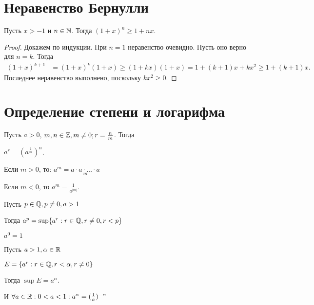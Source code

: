 


\section{Неравенство Бернулли}

\begin{theorem}
    Пусть $x > -1$ и $n \in \mathbb{N}$. Тогда $(1 + x)^n \ge 1 + nx$.

\end{theorem}

\begin{proof}
    Докажем по индукции. При $n = 1$ неравенство очевидно. Пусть оно верно для $n = k$. Тогда
    \begin{align*}
        (1 + x)^{k+1} &= (1 + x)^k (1 + x) \ge (1 + kx)(1 + x) = 1 + (k+1)x + kx^2 \ge 1 + (k+1)x.
    \end{align*}
    Последнее неравенство выполнено, поскольку $kx^2 \ge 0$.
\end{proof}

\section{Определение степени и логарифма}

\begin{definition}
    Пусть $a > 0$, $m, n \in \mathbb{Z}, m \neq 0; r = \frac{n}{m}$. Тогда 
    
    $a^r = (a^{\frac{1}{m}})^n$.

    Если $m > 0$, то: $a^m = \underset{m}{a \cdot a \cdot \ldots \cdot a}$

    Если $m < 0$, то $a^m = \frac{1}{a^{|m|}}$.
\end{definition}


\begin{definition}
    Пусть $p \in \mathbb{Q}, p \neq 0, a > 1$

    Тогда $a^p = \sup\{a^r: r \in \mathbb{Q}, r \neq 0, r < p\}$

    $a^0 = 1$
\end{definition}



\begin{definition}
    Пусть $a > 1, \alpha \in \mathbb{R}$

    $E = \{a^r: r \in \mathbb{Q}, r < \alpha, r \neq 0\}$

    Тогда $\sup E = a^\alpha$.

    И $\forall a \in \mathbb{R}: 0 < a < 1: a^\alpha = (\frac{1}{a})^{-\alpha}$
\end{definition}


